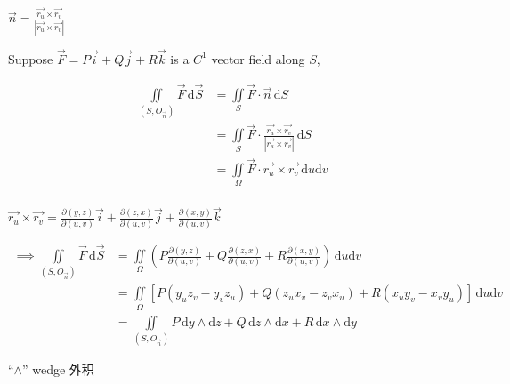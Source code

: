 $\overrightarrow{n}=\frac{\overrightarrow{r_u}\times\overrightarrow{r_v}}{\left|\overrightarrow{r_u}\times\overrightarrow{r_v}\right|}$

Suppose $\overrightarrow{F}=P\overrightarrow{i}+Q\overrightarrow{j}+R\overrightarrow{k}$ is a $C^1$ vector field along $S$,

\begin{align*}
    \iint\limits_{\left(S,O_{\overrightarrow{n}}\right)}\overrightarrow{F}\,\mathrm{d}\overrightarrow{S}
     & =\iint\limits_S\overrightarrow{F}\cdot\overrightarrow{n}\,\mathrm{d}S                                                                                                 \\
     & =\iint\limits_S\overrightarrow{F}\cdot\frac{\overrightarrow{r_u}\times\overrightarrow{r_v}}{\left|\overrightarrow{r_u}\times\overrightarrow{r_v}\right|}\,\mathrm{d}S \\
     & =\iint\limits_\Omega\overrightarrow{F}\cdot\overrightarrow{r_u}\times\overrightarrow{r_v}\,\mathrm{d}u\mathrm{d}v                                                     \\
\end{align*}

$\overrightarrow{r_u}\times\overrightarrow{r_v}=\frac{\partial(y,z)}{\partial(u,v)}\overrightarrow{i}+\frac{\partial(z,x)}{\partial(u,v)}\overrightarrow{j}+\frac{\partial(x,y)}{\partial(u,v)}\overrightarrow{k}$

\begin{align*}
    \implies\iint\limits_{\left(S,O_{\overrightarrow{n}}\right)}\overrightarrow{F}\,\mathrm{d}\overrightarrow{S}
     & =\iint\limits_\Omega\left(P\frac{\partial(y,z)}{\partial(u,v)}+Q\frac{\partial(z,x)}{\partial(u,v)}+R\frac{\partial(x,y)}{\partial(u,v)}\right)\,\mathrm{d}u\mathrm{d}v \\
     & =\iint\limits_\Omega \left[P\left(y_uz_v-y_vz_u\right)+Q\left(z_ux_v-z_vx_u\right)+R\left(x_uy_v-x_vy_u\right)\right]\,\mathrm{d}u\mathrm{d}v                           \\
     & =\iint\limits_{\left(S,O_{\overrightarrow{n}}\right)}P\,\mathrm{d}y\wedge\mathrm{d}z+Q\,\mathrm{d}z\wedge\mathrm{d}x+R\,\mathrm{d}x\wedge\mathrm{d}y
\end{align*}

``$\wedge$'' wedge 外积

